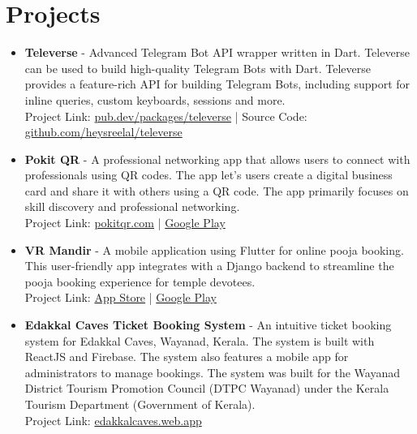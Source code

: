 \documentclass[11pt,a4paper,sans]{moderncv}
\begin{document}
\section{Projects}
\begin{itemize}[label=\textbullet]
    \item \textbf{Televerse} - Advanced Telegram Bot API wrapper written in Dart. Televerse can be used to build high-quality Telegram Bots with Dart. Televerse provides a feature-rich API for building Telegram Bots, including support for inline queries, custom keyboards, sessions and more. \\
          Project Link: \textcolor{blue}{\href{https://pub.dev/packages/televerse}{pub.dev/packages/televerse}} | Source Code: \textcolor{blue}{\href{https://github.com/heysreelal/televerse}{github.com/heysreelal/televerse}}

    \item \textbf{Pokit QR} - A professional networking app that allows users to connect with professionals using QR codes. The app let's users create a digital business card and share it with others using a QR code. The app primarily focuses on skill discovery and professional networking. \\
          Project Link: \textcolor{blue}{\href{https://pokitqr.com/}{pokitqr.com}} | \textcolor{blue}{\href{https://play.google.com/store/apps/details?id=com.pokitqr.pokitqr}{Google Play}}

    \item \textbf{VR Mandir} - A mobile application using Flutter for online pooja booking. This user-friendly app integrates with a Django backend to streamline the pooja booking experience for temple devotees.  \\
          Project Link: \textcolor{blue}{\href{https://apps.apple.com/us/app/vr-mandir/id6444684715}{App Store}} | \textcolor{blue}{\href{https://play.google.com/store/apps/details?id=com.ycorp.vrmandir}{Google Play}}

    \item \textbf{Edakkal Caves Ticket Booking System} - An intuitive ticket booking system for Edakkal Caves, Wayanad, Kerala. The system is built with ReactJS and Firebase. The system also features a mobile app for administrators to manage bookings. The system was built for the Wayanad District Tourism Promotion Council (DTPC Wayanad) under the Kerala Tourism Department (Government of Kerala). \\
          Project Link: \textcolor{blue}{\href{https://edakkalcaves.web.app/}{edakkalcaves.web.app}}


\end{itemize}
\end{document}
